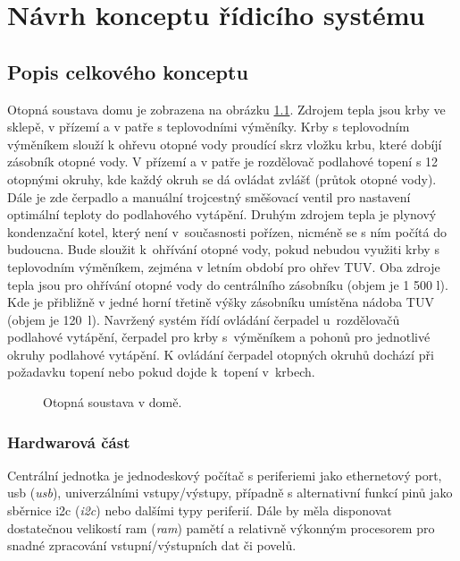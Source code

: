 \chapter{Návrh konceptu řídicího systému}

\section{Popis celkového konceptu}
\label{sec:popis-celkoveho-konceptu}

Otopná soustava domu je zobrazena na obrázku \ref{fig:otopna-soustava-rez-domu}. Zdrojem tepla jsou krby ve sklepě, v přízemí a v patře s teplovodními výměníky. Krby s teplovodním výměníkem slouží k ohřevu otopné vody proudící skrz vložku krbu, které dobíjí zásobník otopné vody. V přízemí a v patře je rozdělovač podlahové topení s 12 otopnými okruhy, kde každý okruh se dá ovládat zvlášť (průtok otopné vody). Dále je zde čerpadlo a manuální trojcestný směšovací ventil pro nastavení optimální teploty do podlahového vytápění. Druhým zdrojem tepla je plynový kondenzační kotel, který není v~současnosti pořízen, nicméně se s ním počítá do budoucna. Bude sloužit k~ohřívání otopné vody, pokud nebudou využiti krby s teplovodním výměníkem, zejména v letním období pro ohřev TUV. Oba zdroje tepla jsou pro ohřívání otopné vody do centrálního zásobníku (objem je 1 500 l). Kde je přibližně v jedné horní třetině výšky zásobníku umístěna nádoba TUV (objem je 120~l). Navržený systém řídí ovládání čerpadel u~rozdělovačů podlahové vytápění, čerpadel pro krby s~výměníkem a pohonů pro jednotlivé okruhy podlahové vytápění. K ovládání čerpadel otopných okruhů dochází při požadavku topení nebo pokud dojde k~topení v~krbech.


\begin{figure}[H]
    \centering
    \def\svgwidth{\columnwidth}
    
    \caption{Otopná soustava v domě.}
    \label{fig:otopna-soustava-rez-domu}
\end{figure}

\subsection{Hardwarová část}

Centrální jednotka je jednodeskový počítač s periferiemi jako ethernetový port, \acrshort{usb} (\textit{\acrlong{usb}}), univerzálními vstupy/výstupy, případně s alternativní funkcí pinů jako sběrnice \acrshort{i2c} (\textit{\acrlong{i2c}}) nebo dalšími typy periferií. Dále by měla disponovat dostatečnou velikostí \acrshort{ram} (\textit{\acrlong{ram}}) pamětí a relativně výkonným procesorem pro snadné zpracování vstupní/výstupních dat či povelů.

